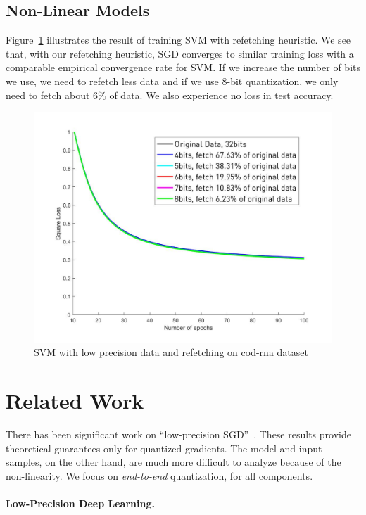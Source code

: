 \documentclass{article}
\begin{document}
\subsection{Non-Linear Models}

Figure~\ref{fig:refetch} illustrates
the result of training SVM
with refetching heuristic. 
We see that, 
with our refetching heuristic,
SGD converges to similar training loss 
with a comparable empirical convergence 
rate for SVM. If we increase the number of
bits we use, we need to refetch less data and
if we use 8-bit quantization, we only need to fetch
about $6\%$ of data.
We also experience no loss in test accuracy.

\begin{figure}[t]
\centering
    \includegraphics[width=0.6\columnwidth]{additional/fetch}
    
\caption{SVM with low precision data and refetching on cod-rna dataset}
\label{fig:refetch}
\end{figure}

\section{Related Work} 

There has been significant work on ``low-precision SGD''~\cite{DeSa:NIPS:2015,Alistarh:2016:ArXiv}. 
These results provide
theoretical guarantees only for quantized gradients.
The model and input samples, on the other hand, are much more difficult
to analyze because of the non-linearity. We focus on {\em end-to-end}
quantization, for all components.

\paragraph{Low-Precision Deep Learning.}
\end{document}
